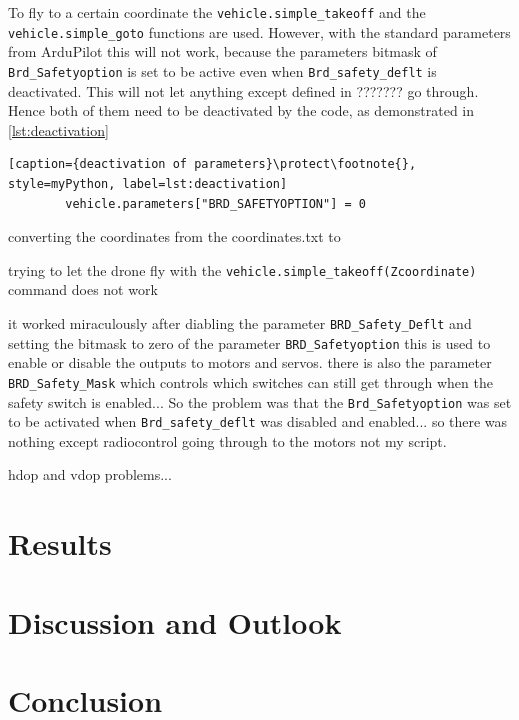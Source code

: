 \documentclass[svgnames]{article}
\begin{document}
	To fly to a certain coordinate the \lstinline|vehicle.simple_takeoff| and the \lstinline|vehicle.simple_goto| functions are used. However, with the standard parameters from ArduPilot this will not work, because the parameters bitmask of  \lstinline|Brd_Safetyoption| is set to be active even when \lstinline|Brd_safety_deflt| is deactivated. 
	This will not let anything except defined in ??????? go through. Hence both of them need to be deactivated by the code, as demonstrated in \cref{lst:deactivation}
	\begin{lstlisting}[caption={deactivation of parameters}\protect\footnote{}, style=myPython, label=lst:deactivation]
		vehicle.parameters["BRD_SAFETYOPTION"] = 0
	\end{lstlisting}
	
	
	converting the coordinates from the coordinates.txt to 
	
	trying to let the drone fly with the \lstinline|vehicle.simple_takeoff(Zcoordinate)| command does not work
	
	it worked miraculously after diabling the parameter \lstinline|BRD_Safety_Deflt| and setting the bitmask to zero of the parameter \lstinline|BRD_Safetyoption| 
	this is used to enable or disable the outputs to motors and servos. there is also the parameter \lstinline|BRD_Safety_Mask| which controls which switches can still get through when the safety switch is enabled... So the problem was that the \lstinline|Brd_Safetyoption| was set to be activated when \lstinline|Brd_safety_deflt| was disabled and enabled... so there was nothing except radiocontrol going through to the motors not my script.
	
	
	hdop and vdop problems...
	
	\section{Results}
	\section{Discussion and Outlook}
	\section{Conclusion}
	
	\appendixpage
	\printbibliography[
		heading=bibintoc,
		title={Bibliography}
	]
	\pagebreak
	\pagebreak
	\listoffigures	
	\pagebreak
	\printglossary[type=\acronymtype]
	
\end{document}
